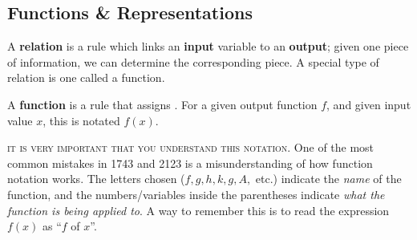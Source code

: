 \documentclass[notes]{subfiles}
\begin{document}
	\subsection*{Functions \& Representations}
		A \textbf{relation} is a rule which links an \textbf{input} variable to an \textbf{output}; given one piece of information, we can determine the corresponding piece.  A special type of relation is one called a function.
		
		\begin{defn}[Function]
			A \textbf{function} is a rule that assigns .  For a given output function $f$, and given input value $x$, this is notated $f(x)$.  
		\end{defn}
		
		\noindent \textsc{it is very important that you understand this notation}.  One of the most common mistakes in 1743 and 2123 is a misunderstanding of how function notation works.  The letters chosen ($f,g,h,k,g,A,$ etc.) indicate the \emph{name} of the function, and the numbers/variables inside the parentheses indicate \emph{what the function is being applied to}.  A way to remember this is to read the expression $f(x)$ as ``$f$ of $x$''.
			\newpage
			
\end{document}
